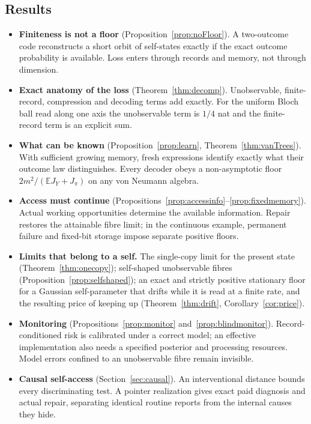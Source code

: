 \documentclass[12pt]{article}
\theoremstyle{definition}
\theoremstyle{remark}
\newcommand{\E}{\mathbb E}
\begin{document}
\subsection{Results}

\begin{itemize}[itemsep=2pt]
\item \textbf{Finiteness is not a floor} (Proposition~\ref{prop:noFloor}). A two-outcome code reconstructs a short orbit of self-states exactly if the exact outcome probability is available. Loss enters through records and memory, not through dimension.
\item \textbf{Exact anatomy of the loss} (Theorem~\ref{thm:decomp}). Unobservable, finite-record, compression and decoding terms add exactly. For the uniform Bloch ball read along one axis the unobservable term is $1/4$ nat and the finite-record term is an explicit sum.
\item \textbf{What can be known} (Proposition~\ref{prop:learn}, Theorem~\ref{thm:vanTrees}). With sufficient growing memory, fresh expressions identify exactly what their outcome law distinguishes. Every decoder obeys a non-asymptotic floor $2m^2/(\E J_Y+J_\pi)$ on any von Neumann algebra.
\item \textbf{Access must continue} (Propositions~\ref{prop:accessinfo}--\ref{prop:fixedmemory}). Actual working opportunities determine the available information. Repair restores the attainable fibre limit; in the continuous example, permanent failure and fixed-bit storage impose separate positive floors.
\item \textbf{Limits that belong to a self.} The single-copy limit for the present state (Theorem~\ref{thm:onecopy}); self-shaped unobservable fibres (Proposition~\ref{prop:selfshaped}); an exact and strictly positive stationary floor for a Gaussian self-parameter that drifts while it is read at a finite rate, and the resulting price of keeping up (Theorem~\ref{thm:drift}, Corollary~\ref{cor:price}).
\item \textbf{Monitoring} (Propositions~\ref{prop:monitor} and~\ref{prop:blindmonitor}). Record-conditioned risk is calibrated under a correct model; an effective implementation also needs a specified posterior and processing resources. Model errors confined to an unobservable fibre remain invisible.
\item \textbf{Causal self-access} (Section~\ref{sec:causal}). An interventional distance bounds every discriminating test. A pointer realization gives exact paid diagnosis and actual repair, separating identical routine reports from the internal causes they hide.

\end{itemize}
\end{document}
